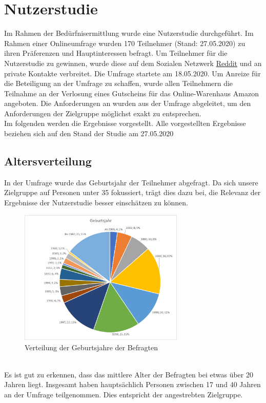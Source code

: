 \section{Nutzerstudie}
Im Rahmen der Bedürfnisermittlung wurde eine Nutzerstudie durchgeführt. Im Rahmen einer Onlineumfrage wurden 170 Teilnehmer (Stand: 27.05.2020) zu ihren Präferenzen und Hauptinteressen befragt.
Um Teilnehmer für die Nutzerstudie zu gewinnen, wurde diese auf dem Sozialen Netzwerk \href{https://www.reddit.com/}{Reddit} und an private Kontakte verbreitet. Die Umfrage startete am 18.05.2020. Um Anreize für die Beteiligung an der Umfrage zu schaffen, wurde allen Teilnehmern die Teilnahme an der Verlosung eines Gutscheins für das Online-Warenhaus Amazon angeboten.
Die Anforderungen an \softwarename wurden aus der Umfrage abgeleitet, um den Anforderungen der Zielgruppe möglichst exakt zu entsprechen.
\\
Im folgenden werden die Ergebnisse vorgestellt.
Alle vorgestellten Ergebnisse beziehen sich auf den Stand der Studie am 27.05.2020

\subsection{Altersverteilung}
In der Umfrage wurde das Geburtsjahr der Teilnehmer abgefragt. Da sich unsere Zielgruppe auf Personen unter 35 fokussiert, trägt dies dazu bei, die Relevanz der Ergebnisse der Nutzerstudie besser einschätzen zu können.
\\
\begin{figure}[h]
    \centering
    \includegraphics[width=0.7\textwidth]{media/diagram/geburtsjahr.png}
    \caption{Verteilung der Geburtsjahre der Befragten}
\end{figure}
\\
Es ist gut zu erkennen, dass das mittlere Alter der Befragten bei etwas über 20 Jahren liegt. Insgesamt haben hauptsächlich Personen zwischen 17 und 40 Jahren an der Umfrage teilgenommen.
Dies entspricht der angestrebten Zielgruppe.
